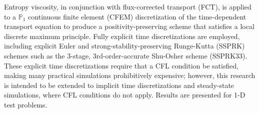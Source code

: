 Entropy viscosity, in conjunction with flux-corrected transport (FCT), is applied to a
$\mathbb{P}_1$ continuous finite element (CFEM) discretization of the time-dependent
transport equation to produce a positivity-preserving scheme that satisfies
a local discrete maximum principle. Fully explicit time discretizations are
employed, including
explicit Euler and strong-stability-preserving Runge-Kutta (SSPRK) schemes
such as the 3-stage, 3rd-order-accurate Shu-Osher scheme (SSPRK33).
These explicit time discretizations require that a CFL condition be
satisfied, making many practical simulations prohibitively expensive; however,
this research is intended to be extended to implicit time discretizations
and steady-state simulations, where CFL conditions do not apply.
Results are presented for 1-D test problems.

